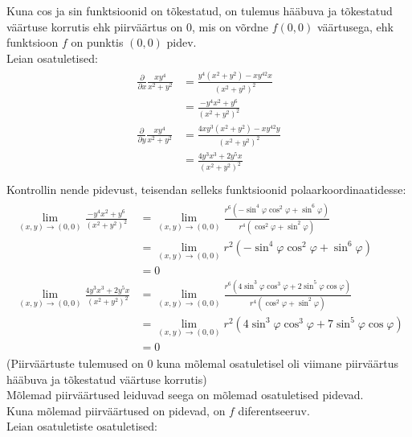 \documentclass{article}
\newcommand{\p}[1]{\frac{\partial}{\partial #1}}
\begin{document}
Kuna cos ja sin funktsioonid on tõkestatud, on tulemus hääbuva ja tõkestatud väärtuse korrutis ehk piirväärtus on 0, mis on võrdne $f(0,0)$ väärtusega, ehk funktsioon $f$ on punktis $(0,0)$ pidev.\\
Leian osatuletised:
\begin{gather*}
\begin{aligned}
\p{x}\frac{xy^4}{x^2+y^2}&=\frac{y^4(x^2+y^2)-xy^42x}{(x^2+y^2)^2}\\
&=\frac{-y^4x^2+y^6}{(x^2+y^2)^2}\\
\p{y}\frac{xy^4}{x^2+y^2}&=\frac{4xy^3(x^2+y^2)-xy^42y}{(x^2+y^2)^2}\\
&=\frac{4y^3x^3+2y^5x}{(x^2+y^2)^2}\\
\end {aligned}
\end{gather*}
Kontrollin nende pidevust, teisendan selleks funktsioonid polaarkoordinaatidesse:
\begin{gather*}
\begin{aligned}
\lim_{(x,y)\to(0,0)}\frac{-y^4x^2+y^6}{(x^2+y^2)^2}&=\lim_{(x,y)\to(0,0)}\frac{r^6(-\sin^4\varphi\cos^2\varphi+\sin^6\varphi)}{r^4(\cos^2\varphi+\sin^2\varphi)}\\
&=\lim_{(x,y)\to(0,0)}r^2(-\sin^4\varphi\cos^2\varphi+\sin^6\varphi)\\
&=0\\
\lim_{(x,y)\to(0,0)}\frac{4y^3x^3+2y^5x}{(x^2+y^2)^2}&=\lim_{(x,y)\to(0,0)}\frac{r^6(4\sin^3\varphi\cos^3\varphi+2\sin^5\varphi\cos\varphi)}{r^4(\cos^2\varphi+\sin^2\varphi)}\\
&=\lim_{(x,y)\to(0,0)}r^2(4\sin^3\varphi\cos^3\varphi+7\sin^5\varphi\cos\varphi)\\
&=0
\end {aligned}
\end{gather*}
(Piirväärtuste tulemused on 0 kuna mõlemal osatuletisel oli viimane piirväärtus hääbuva ja tõkestatud väärtuse korrutis)\\
Mõlemad piirväärtused leiduvad seega on mõlemad osatuletised pidevad.\\
Kuna mõlemad piirväärtused on pidevad, on $f$ diferentseeruv.\\
Leian osatuletiste osatuletised:
\end{document}
